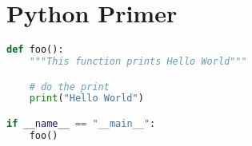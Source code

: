 \chapter{Python Primer}

\begin{lstlisting}[language=Python]
def foo():
    """This function prints Hello World"""

    # do the print
    print("Hello World")

if __name__ == "__main__":
    foo()
\end{lstlisting}